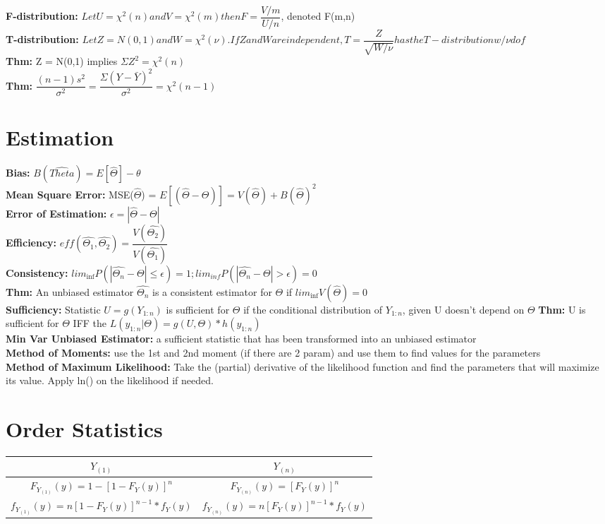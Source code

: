 \documentclass{article}
\begin{document}
\begin{multicols}{2}
\begin{tabular}{| c | c | c | c |}
\end{tabular}\\
\textbf{F-distribution:} $Let U = \chi^2(n) and V = \chi^2(m) then  F = \dfrac{V/m}{U/n}$, denoted F(m,n)\\
\textbf{T-distribution:} $Let Z = N(0,1) and W = \chi^2(\nu). If Z and W are independent, T = \dfrac{Z}{\sqrt{W/\nu}} has the T-distribution w/ \nu dof$\\ 
\textbf{Thm:} Z = N(0,1) implies $\Sigma Z^2 = \chi^2(n)$ \\ 
\textbf{Thm:} $\dfrac{(n-1)s^2}{\sigma^2} = \dfrac{\Sigma (Y-\bar{Y})^2}{\sigma^2} = \chi^2(n-1)$

\section{Estimation}
\textbf{Bias:} $B(\hat{Theta}) = E[\hat{\Theta}] - \theta$ \\
\textbf{Mean Square Error:} 
MSE($\hat{\Theta}$) = $E[(\hat{\Theta} - \Theta)] = V(\hat{\Theta}) + B(\hat{\Theta})^2$ \\
\textbf{Error of Estimation:} $\epsilon = |\hat{\Theta} - \Theta|$\\
\textbf{Efficiency:} $eff(\hat{\Theta_1}, \hat{\Theta_2}) = \dfrac{V(\hat{\Theta_2})}{V(\hat{\Theta_1})}$\\
\textbf{Consistency:} $lim_{\inf}P(|\hat{\Theta_n}-\Theta|\leq \epsilon) = 1; lim_{inf}P(|\hat{\Theta_n}-\Theta|> \epsilon) = 0$ \\
\textbf{Thm:} An unbiased estimator $\hat{\Theta_n}$ is a consistent estimator for $\Theta$ if $lim_{\inf}V(\hat{\Theta}) = 0$ \\
\textbf{Sufficiency:} Statistic $U = g(Y_{1:n})$ is sufficient for $\Theta$ if the conditional distribution of $Y_{1:n}$, given U doesn't depend on $\Theta$
\textbf{Thm:} U is sufficient for $\Theta$ IFF the $L(y_{1:n}|\Theta) = g(U, \Theta)*h(y_{1:n})$\\
\textbf{Min Var Unbiased Estimator:} a sufficient statistic that has been transformed into an unbiased estimator\\
\textbf{Method of Moments:} use the 1st and 2nd moment (if there are 2 param) and use them to find values for the parameters\\
\textbf{Method of Maximum Likelihood:} Take the (partial) derivative of the likelihood function and find the parameters that will maximize its value. Apply ln() on the likelihood if needed.

\section{Order Statistics}
\begin{tabular}{|c|c|}
\hline
\textbf{$Y_{(1)}$} & \textbf{$Y_{(n)}$} \\ \hline
$F_{Y_{(1)}}(y) = 1-[1-F_Y(y)]^{n}$ & $F_{Y_{(n)}}(y) = [F_Y(y)]^{n}$\\ \hline
$f_{Y_{(1)}}(y) = n[1-F_Y(y)]^{n-1}*f_Y(y) $ &
$f_{Y_{(n)}}(y) = n[F_Y(y)]^{n-1}*f_Y(y) $\\ \hline
\end{tabular}


\end{multicols}
\end{document}
